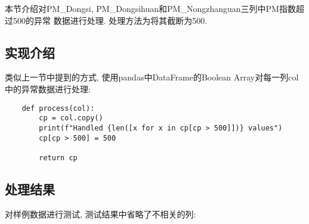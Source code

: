 本节介绍对PM\_Dongsi, PM\_Dongsihuan和PM\_Nongzhanguan三列中PM指数超过500的异常
数据进行处理. 处理方法为将其截断为500.\par

\subsection{实现介绍}
类似上一节中提到的方式, 使用pandas中DataFrame的Boolean Array对每一列col中的异常数据进行处理:
\begin{lstlisting}
    def process(col):
        cp = col.copy()
        print(f"Handled {len([x for x in cp[cp > 500]])} values")
        cp[cp > 500] = 500

        return cp
\end{lstlisting}

\subsection{处理结果}
对样例数据进行测试, 测试结果中省略了不相关的列:
